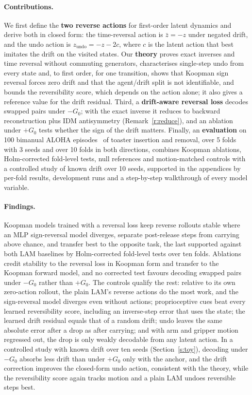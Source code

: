 \documentclass{jcse}
\newcommand{\zb}{\bar{z}}
\newcommand{\zundo}{z_{\mathrm{undo}}}
\begin{document}
\paragraph{Contributions.}
We first define the \textbf{two reverse actions} for first-order latent dynamics and derive both in closed form: the time-reversal action is $\zb=-z$ under negated drift, and the undo action is $\zundo=-z-2c$, where $c$ is the latent action that best imitates the drift on the visited states.
Our \textbf{theory} proves exact inverses and time reversal without commuting generators, characterises single-step undo from every state and, to first order, for one transition, shows that Koopman sign reversal forces zero drift and that the agent/drift split is not identifiable, and bounds the reversibility score, which depends on the action alone; it also gives a reference value for the drift residual.
Third, a \textbf{drift-aware reversal loss} decodes swapped pairs under $-G_0$; with the exact inverse it reduces to backward reconstruction plus IDM antisymmetry (Remark~\ref{r:reduce}), and an ablation under $+G_0$ tests whether the sign of the drift matters.
Finally, an \textbf{evaluation} on 100 bimanual ALOHA episodes~\cite{zhao2023aloha} of toaster insertion and removal, over 5 folds with 3 seeds and over 10 folds in both directions, combines Koopman ablations, Holm-corrected fold-level tests, null references and motion-matched controls with a controlled study of known drift over 10 seeds, supported in the appendices by per-fold results, development runs and a step-by-step walkthrough of every model variable.

\paragraph{Findings.}
Koopman models trained with a reversal loss keep reverse rollouts stable where an MLP sign-reversal model diverges, separate post-release steps from carrying above chance, and transfer best to the opposite task, the last supported against both LAM baselines by Holm-corrected fold-level tests over ten folds.
Ablations credit stability to the reversal loss in Koopman form and transfer to the Koopman forward model, and no corrected test favours decoding swapped pairs under $-G_0$ rather than $+G_0$.
The controls qualify the rest: relative to its own zero-action rollout, the plain LAM's reverse actions do the most work, and the sign-reversal model diverges even without actions; proprioceptive cues beat every learned reversibility score, including an inverse-step error that uses the state; the learned drift residual equals that of a random drift; undo leaves the same absolute error after a drop as after carrying; and with arm and gripper motion regressed out, the drop is only weakly decodable from any latent action.
In a controlled study with known drift over ten seeds (Section~\ref{s:toy}), decoding under $-G_0$ absorbs less drift than under $+G_0$ only with the anchor, and the drift correction improves the closed-form undo action, consistent with the theory, while the reversibility score again tracks motion and a plain LAM undoes reversible steps best.
\end{document}
